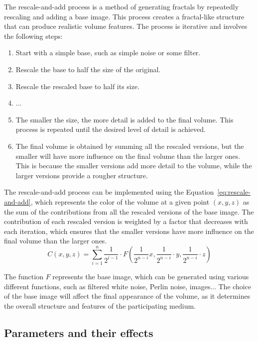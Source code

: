 The rescale-and-add process is a method of generating fractals by repeatedly rescaling and adding a base image. This process creates a fractal-like structure that can produce realistic volume features. The process is iterative and involves the following steps:
\begin{enumerate}
    \item Start with a simple base, such as simple noise or some filter.
    \item Rescale the base to half the size of the original.
    \item Rescale the rescaled base to half its size.
    \item ...
    \item The smaller the size, the more detail is added to the final volume. This process is repeated until the desired level of detail is achieved.
    \item The final volume is obtained by summing all the rescaled versions, but the smaller will have more influence on the final volume than the larger ones. This is because the smaller versions add more detail to the volume, while the larger versions provide a rougher structure.
\end{enumerate}

The rescale-and-add process can be implemented using the Equation~\eqref{eq:rescale-and-add}, which represents the color of the volume at a given point $(x, y, z)$ as the sum of the contributions from all the rescaled versions of the base image. The contribution of each rescaled version is weighted by a factor that decreases with each iteration, which ensures that the smaller versions have more influence on the final volume than the larger ones.
\begin{equation}
    C(x, y, z) = \sum_{i=1}^{n} \frac{1}{2^{i-1}} \cdot F\left( \frac{1}{2^{n-i}} x, \frac{1}{2^{n-i}}\cdot y, \frac{1}{2^{n-i}}\cdot z \right)
    \label{eq:rescale-and-add}
\end{equation}

The function $F$ represents the base image, which can be generated using various different functions, such as filtered white noise, Perlin noise, images... The choice of the base image will affect the final appearance of the volume, as it determines the overall structure and features of the participating medium.

\subsection{Parameters and their effects}

